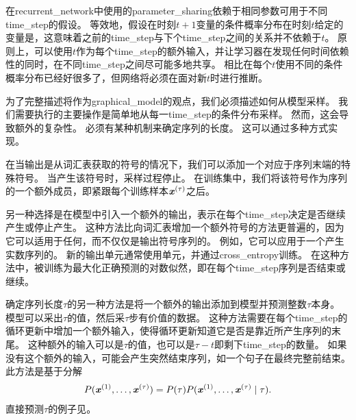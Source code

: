 在\gls{recurrent_network}中使用的\gls{parameter_sharing}依赖于相同参数可用于不同\gls{time_step}的假设。
等效地，假设在时刻$t +1$变量的条件概率分布在时刻$t$给定的变量是，这意味着之前的\gls{time_step}与下个\gls{time_step}之间的关系并不依赖于$t$。
原则上，可以使用$t$作为每个\gls{time_step}的额外输入，并让学习器在发现任何时间依赖性的同时，在不同\gls{time_step}之间尽可能多地共享。
相比在每个$t$使用不同的条件概率分布已经好很多了，但网络将必须在面对新$t$时进行推断。

为了完整描述将作为\gls{graphical_model}的观点，我们必须描述如何从模型采样。
我们需要执行的主要操作是简单地从每一\gls{time_step}的条件分布采样。
然而，这会导致额外的复杂性。
必须有某种机制来确定序列的长度。
这可以通过多种方式实现。

在当输出是从词汇表获取的符号的情况下，我们可以添加一个对应于序列末端的特殊符号\citep{schmidhuber2012self}。
当产生该符号时，采样过程停止。
在训练集中，我们将该符号作为序列的一个额外成员，即紧跟每个训练样本$\boldsymbol{\mathit{x}}^{(\tau)}$之后。


另一种选择是在模型中引入一个额外的输出，表示在每个\gls{time_step}决定是否继续产生或停止产生。
这种方法比向词汇表增加一个额外符号的方法更普遍的，因为它可以适用于任何，而不仅仅是输出符号序列的。
例如，它可以应用于一个产生实数序列的。
新的输出单元通常使用单元，并通过\gls{cross_entropy}训练。
在这种方法中，被训练为最大化正确预测的对数似然，即在每个\gls{time_step}序列是否结束或继续。

确定序列长度$\tau$的另一种方法是将一个额外的输出添加到模型并预测整数$\tau$本身。
模型可以采出$\tau$的值，然后采$\tau$步有价值的数据。
这种方法需要在每个\gls{time_step}的循环更新中增加一个额外输入，使得循环更新知道它是否是靠近所产生序列的末尾。
这种额外的输入可以是$\tau$的值，也可以是$\tau - t$即剩下\gls{time_step}的数量。
如果没有这个额外的输入，可能会产生突然结束序列，如一个句子在最终完整前结束。
此方法是基于分解
\begin{align}
 P(\boldsymbol{\mathit{x}}^{(1)},\dots, \boldsymbol{\mathit{x}}^{(\tau)}) = P(\tau) P(\boldsymbol{\mathit{x}}^{(1)},\dots,\boldsymbol{\mathit{x}}^{(\tau)} \mid \tau) .
\end{align}
直接预测$\tau$的例子见\cite{Goodfellow+et+al-ICLR2014a}。


